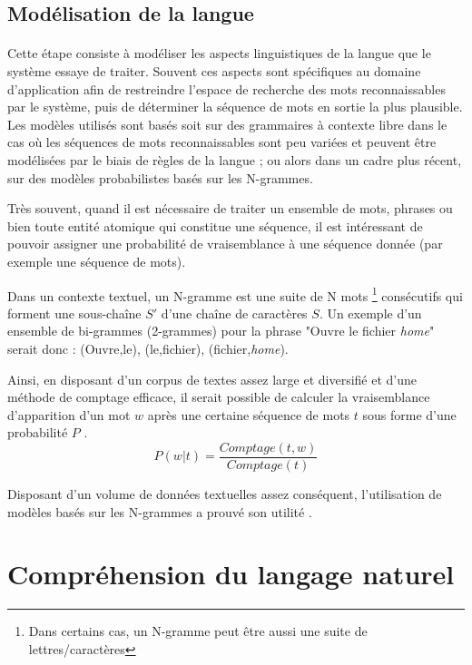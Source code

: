 \subsection{Modélisation de la langue}
\paragraph{}
Cette étape consiste à modéliser les aspects linguistiques de la langue que le système essaye de traiter. Souvent ces aspects sont spécifiques au domaine d'application afin de restreindre l'espace de recherche des mots reconnaissables par le système, puis de déterminer la séquence de mots en sortie la plus plausible. Les modèles utilisés sont basés soit sur des grammaires à contexte libre dans le cas où les séquences de mots reconnaissables sont peu variées et peuvent être modélisées par le biais de règles de la langue \citep{LM_grammar}; ou alors dans un cadre plus récent, sur des modèles probabilistes basés sur les N-grammes.
\par
\label{n-grams}
Très souvent, quand il est nécessaire de traiter un ensemble de mots, phrases ou bien toute entité atomique qui constitue une séquence, il est intéressant de pouvoir assigner une probabilité de vraisemblance à une séquence donnée (par exemple une séquence de mots). 
\par Dans un contexte textuel, un N-gramme est une suite de N mots \footnote{Dans certains cas, un N-gramme peut être aussi une suite de lettres/caractères} consécutifs qui forment une sous-chaîne $S'$ d'une chaîne de caractères $S$. Un exemple d'un ensemble de bi-grammes (2-grammes) pour la phrase "Ouvre le fichier \textit{home}" serait donc : (Ouvre,le), (le,fichier), (fichier,\textit{home}).
\par 
Ainsi, en disposant d'un corpus de textes assez large et diversifié et d'une méthode de comptage efficace, il serait possible de calculer la vraisemblance d'apparition d'un mot $w$ après une certaine séquence de mots $t$ sous forme d'une probabilité $P$ \citep{nlp_ngrams}.
\begin{equation}
P(w|t) = \frac{Comptage(t,w)}{Comptage(t)}
\end{equation}
\par
Disposant d'un volume de données textuelles assez conséquent, l'utilisation de modèles basés sur les N-grammes a prouvé son utilité \citep{nlp_ngrams,speech_reco_Yu2015,LM_n-grams} .


\section{Compréhension du langage naturel}
